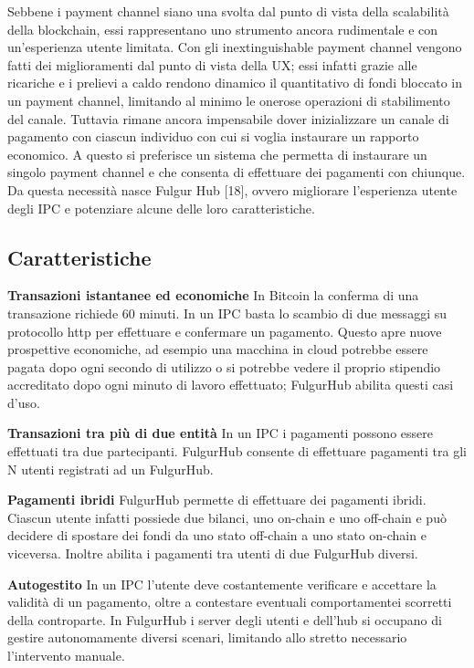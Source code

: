 \documentclass[12pt,italian,]{book}
\begin{document}
Sebbene i payment channel siano una svolta dal punto di vista della scalabilità della blockchain, essi rappresentano uno strumento ancora rudimentale e con un'esperienza utente limitata. Con gli inextinguishable payment channel vengono fatti dei miglioramenti dal punto di vista della UX; essi infatti grazie alle ricariche e i prelievi a caldo rendono dinamico il quantitativo di fondi bloccato in un payment channel, limitando al minimo le onerose operazioni di stabilimento del canale. Tuttavia rimane ancora impensabile dover inizializzare un canale di pagamento con ciascun individuo con cui si voglia instaurare un rapporto economico. A questo si preferisce un sistema che permetta di instaurare un singolo payment channel e che consenta di effettuare dei pagamenti con chiunque. Da questa necessità nasce Fulgur Hub {[}18{]}, ovvero migliorare l'esperienza utente degli IPC e potenziare alcune delle loro caratteristiche.

\hypertarget{caratteristiche}{%
\subsection{Caratteristiche}\label{caratteristiche}}

\textbf{\textbf{Transazioni istantanee ed economiche}} In Bitcoin la conferma di una transazione richiede 60 minuti. In un IPC basta lo scambio di due messaggi su protocollo http per effettuare e confermare un pagamento. Questo apre nuove prospettive economiche, ad esempio una macchina in cloud potrebbe essere pagata dopo ogni secondo di utilizzo o si potrebbe vedere il proprio stipendio accreditato dopo ogni minuto di lavoro effettuato; FulgurHub abilita questi casi d'uso.

\textbf{\textbf{Transazioni tra più di due entità}} In un IPC i pagamenti possono essere effettuati tra due partecipanti. FulgurHub consente di effettuare pagamenti tra gli N utenti registrati ad un FulgurHub.

\textbf{\textbf{Pagamenti ibridi}} FulgurHub permette di effettuare dei pagamenti ibridi. Ciascun utente infatti possiede due bilanci, uno on-chain e uno off-chain e può decidere di spostare dei fondi da uno stato off-chain a uno stato on-chain e viceversa. Inoltre abilita i pagamenti tra utenti di due FulgurHub diversi.

\textbf{\textbf{Autogestito}} In un IPC l'utente deve costantemente verificare e accettare la validità di un pagamento, oltre a contestare eventuali comportamentei scorretti della controparte. In FulgurHub i server degli utenti e dell'hub si occupano di gestire autonomamente diversi scenari, limitando allo stretto necessario l'intervento manuale.
\end{document}
